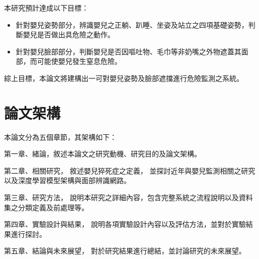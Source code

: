 \documentclass[class=NCU_thesis, crop=false]{standalone}
\begin{document}
本研究預計達成以下目標：
\begin{itemize}
    \item 針對嬰兒姿勢部分，辨識嬰兒之正躺、趴睡、坐姿及站立之四項基礎姿勢，判斷嬰兒是否做出具危險之動作。
    \item 針對嬰兒臉部部分，判斷嬰兒是否因嘔吐物、毛巾等非奶嘴之外物遮蓋其面部，而可能使嬰兒發生窒息危險。
\end{itemize}

綜上目標，本論文將建構出一可對嬰兒姿勢及臉部遮擋進行危險監測之系統。

\section{論文架構}
本論文分為五個章節，其架構如下：

第一章、緒論，敘述本論文之研究動機、研究目的及論文架構。

第二章、相關研究，
敘述嬰兒猝死症之定義，
並探討近年與嬰兒監測相關之研究以及深度學習模型架構與面部辨識網路。

第三章、研究方法，
說明本研究之詳細內容，包含完整系統之流程說明以及資料集之分類定義及前處理等。

第四章、實驗設計與結果，
說明各項實驗設計內容以及評估方法，並對於實驗結果進行探討。

第五章、結論與未來展望，
對於研究結果進行總結，並討論研究的未來展望。
\end{document}
